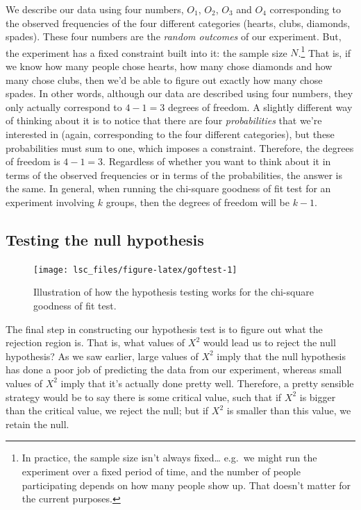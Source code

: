 \documentclass[
]{book}
\theoremstyle{definition}
\theoremstyle{definition}
\theoremstyle{definition}
\theoremstyle{definition}
\theoremstyle{remark}
\begin{document}
We describe our data using four numbers, \(O_1\), \(O_2\), \(O_3\) and \(O_4\) corresponding to the observed frequencies of the four different categories (hearts, clubs, diamonds, spades). These four numbers are the \emph{random outcomes} of our experiment. But, the experiment has a fixed constraint built into it: the sample size \(N\).\footnote{In practice, the sample size isn't always fixed\ldots{} e.g.~we might run the experiment over a fixed period of time, and the number of people participating depends on how many people show up. That doesn't matter for the current purposes.} That is, if we know how many people chose hearts, how many chose diamonds and how many chose clubs, then we'd be able to figure out exactly how many chose spades. In other words, although our data are described using four numbers, they only actually correspond to \(4-1 = 3\) degrees of freedom. A slightly different way of thinking about it is to notice that there are four \emph{probabilities} that we're interested in (again, corresponding to the four different categories), but these probabilities must sum to one, which imposes a constraint. Therefore, the degrees of freedom is \(4-1 = 3\). Regardless of whether you want to think about it in terms of the observed frequencies or in terms of the probabilities, the answer is the same. In general, when running the chi-square goodness of fit test for an experiment involving \(k\) groups, then the degrees of freedom will be \(k-1\).

\hypertarget{testing-the-null-hypothesis}{%
\subsection{Testing the null hypothesis}\label{testing-the-null-hypothesis}}

\begin{figure}

{\centering \texttt{[image: lsc\_files/figure-latex/goftest-1]} 

}

\caption{Illustration of how the hypothesis testing works for the chi-square goodness of fit test.}\label{fig:goftest}
\end{figure}

The final step in constructing our hypothesis test is to figure out what the rejection region is. That is, what values of \(X^2\) would lead us to reject the null hypothesis? As we saw earlier, large values of \(X^2\) imply that the null hypothesis has done a poor job of predicting the data from our experiment, whereas small values of \(X^2\) imply that it's actually done pretty well. Therefore, a pretty sensible strategy would be to say there is some critical value, such that if \(X^2\) is bigger than the critical value, we reject the null; but if \(X^2\) is smaller than this value, we retain the null.
\end{document}
